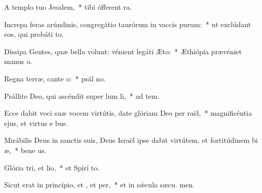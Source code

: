 \item A templo tuo  Jesalem,~* tibi ófferent  ra.
\item Increpa feras arúndinis, congregátio taurórum in vaccis purum:~* ut exclúdant eos, qui probáti  to.
\item Díssipa Gentes, quæ bella volunt: vénient legáti  Æto:~* Æthiópia prævéniet manus  o.
\item Regna terræ, cante o:~* psál no.
\item Psállite Deo, qui ascéndit super lum li,~* ad tem.
\item Ecce dabit voci suæ vocem virtútis, date glóriam Deo per raël,~* magnificéntia ejus, et virtus e  bus.
\item Mirábilis Deus in sanctis suis, Deus Israël ipse dabit virtútem, et fortitúdinem bi æ,~* bene us.
\item Glória tri, et lio,~* et Spirí to.
\item Sicut erat in princípio, et , et per,~* et in sǽcula sæcu. men.
